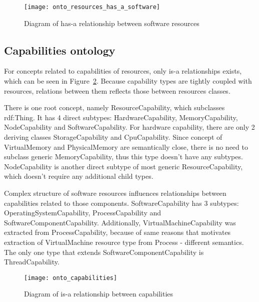 \begin{figure}[ht]
  \centering
  \texttt{[image: onto\_resources\_has\_a\_software]}
  \caption{Diagram of has-a relationship between software resources}
  \label{fig:onto_resources_has_a_software}
\end{figure}

\pagebreak

\subsection{Capabilities ontology}
\label{subsec:arch_knowledge_capabilitie}

For concepts related to capabilities of resources, only is-a relationships exists, which can be seen in
Figure~\ref{fig:onto_capabilities}. Because capability types are tightly coupled with resources, relations between them
reflects those between resources classes. 

There is one root concept, namely ResourceCapability, which subclasses rdf:Thing. It has 4 direct subtypes:
HardwareCapability, MemoryCapability, NodeCapability and SoftwareCapability. For hardware capability, there are only 2
deriving classes StorageCapability and CpuCapability. Since concept of VirtualMemory and PhysicalMemory are semantically
close, there is no need to subclass generic MemoryCapability, thus this type doesn't have any subtypes. NodeCapability
is another direct subtype of most generic ResourceCapability, which doesn't require any additional child types. 

Complex structure of software resources influences relationships between capabilities related to those components.
SoftwareCapability has 3 subtypes: OperatingSystemCapability, ProcessCapability and SoftwareComponentCapability.
Additionally, VirtualMachineCapability was extracted from ProcessCapability, because of same reasons that motivates
extraction of VirtualMachine resource type from Process - different semantics. The only one type that extends
SoftwareComponentCapability is ThreadCapability.


\begin{figure}[ht]
  \centering
  \texttt{[image: onto\_capabilities]}
  \caption{Diagram of is-a relationship between capabilities}
  \label{fig:onto_capabilities}
\end{figure}





